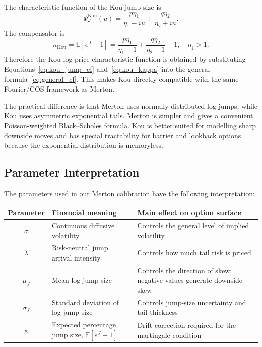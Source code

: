 \documentclass[12pt]{article}
\begin{document}
The characteristic function of the Kou jump size is
\begin{equation}
\Psi_J^{\mathrm{Kou}}(u)
=\frac{p\eta_1}{\eta_1-iu}
+\frac{q\eta_2}{\eta_2+iu}.
\label{eq:kou_jump_cf}
\end{equation}
The compensator is
\begin{equation}
\kappa_{\mathrm{Kou}}
=\mathbb{E}[e^J-1]
=\frac{p\eta_1}{\eta_1-1}
+\frac{q\eta_2}{\eta_2+1}-1,
\quad \eta_1>1.
\label{eq:kou_kappa}
\end{equation}
Therefore the Kou log-price characteristic function is obtained by substituting Equations~\eqref{eq:kou_jump_cf} and~\eqref{eq:kou_kappa} into the general formula~\eqref{eq:general_cf}. This makes Kou directly compatible with the same Fourier/COS framework as Merton.

The practical difference is that Merton uses normally distributed log-jumps, while Kou uses asymmetric exponential tails. Merton is simpler and gives a convenient Poisson-weighted Black--Scholes formula. Kou is better suited for modelling sharp downside moves and has special tractability for barrier and lookback options because the exponential distribution is memoryless.

\subsection*{Parameter Interpretation}

The parameters used in our Merton calibration have the following interpretation:
\begin{center}
\begin{tabular}{|c|p{6.5cm}|p{4.2cm}|}
\hline
Parameter & Financial meaning & Main effect on option surface \\
\hline
$\sigma$ & Continuous diffusive volatility & Controls the general level of implied volatility \\
\hline
$\lambda$ & Risk-neutral jump arrival intensity & Controls how much tail risk is priced \\
\hline
$\mu_J$ & Mean log-jump size & Controls the direction of skew; negative values generate downside skew \\
\hline
$\sigma_J$ & Standard deviation of log-jump size & Controls jump-size uncertainty and tail thickness \\
\hline
$\kappa$ & Expected percentage jump size, $\mathbb{E}[e^J-1]$ & Drift correction required for the martingale condition \\
\hline
\end{tabular}
\end{center}
\end{document}
